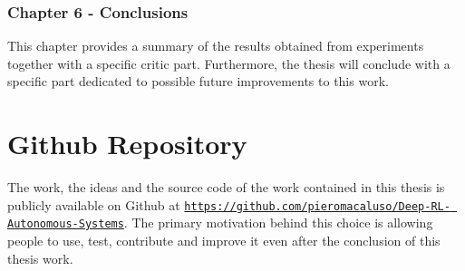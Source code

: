 \subsubsection*{Chapter 6 - Conclusions} 

This chapter provides a summary of the results obtained from experiments together with a specific critic part.
Furthermore, the thesis will conclude with a specific part dedicated to possible future improvements to this work.

\section{Github Repository}

The work, the ideas and the source code of the work contained in this thesis is publicly available on Github at \href{https://github.com/pieromacaluso/Deep-RL-Autonomous-Systems}{\texttt{https://github.com/pieromacaluso/Deep-RL- Autonomous-Systems}}. The primary motivation behind this choice is allowing people to use, test, contribute and improve it even after the conclusion of this thesis work.
